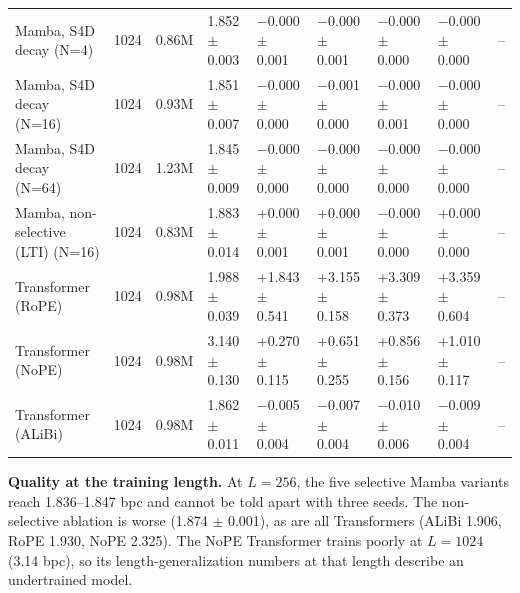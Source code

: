 \documentclass[11pt]{article}
\begin{document}
\begin{table}[t]
{\begin{tabular}{lllllllll}
Mamba, S4D decay (N=4) & 1024 & 0.86M & 1.852 $\pm$ 0.003 & $-$0.000 $\pm$ 0.001 & $-$0.000 $\pm$ 0.001 & $-$0.000 $\pm$ 0.000 & $-$0.000 $\pm$ 0.000 & -- \\
Mamba, S4D decay (N=16) & 1024 & 0.93M & 1.851 $\pm$ 0.007 & $-$0.000 $\pm$ 0.000 & $-$0.001 $\pm$ 0.000 & $-$0.000 $\pm$ 0.001 & $-$0.000 $\pm$ 0.000 & -- \\
Mamba, S4D decay (N=64) & 1024 & 1.23M & 1.845 $\pm$ 0.009 & $-$0.000 $\pm$ 0.000 & $-$0.000 $\pm$ 0.000 & $-$0.000 $\pm$ 0.000 & $-$0.000 $\pm$ 0.000 & -- \\
Mamba, non-selective (LTI) (N=16) & 1024 & 0.83M & 1.883 $\pm$ 0.014 & +0.000 $\pm$ 0.001 & +0.000 $\pm$ 0.001 & $-$0.000 $\pm$ 0.000 & +0.000 $\pm$ 0.000 & -- \\
Transformer (RoPE) & 1024 & 0.98M & 1.988 $\pm$ 0.039 & +1.843 $\pm$ 0.541 & +3.155 $\pm$ 0.158 & +3.309 $\pm$ 0.373 & +3.359 $\pm$ 0.604 & -- \\
Transformer (NoPE) & 1024 & 0.98M & 3.140 $\pm$ 0.130 & +0.270 $\pm$ 0.115 & +0.651 $\pm$ 0.255 & +0.856 $\pm$ 0.156 & +1.010 $\pm$ 0.117 & -- \\
Transformer (ALiBi) & 1024 & 0.98M & 1.862 $\pm$ 0.011 & $-$0.005 $\pm$ 0.004 & $-$0.007 $\pm$ 0.004 & $-$0.010 $\pm$ 0.006 & $-$0.009 $\pm$ 0.004 & -- \\
\bottomrule
\end{tabular}}
\end{table}

\textbf{Quality at the training length.} At $L = 256$, the five selective Mamba variants reach 1.836--1.847 bpc and cannot be told apart with three seeds. The non-selective ablation is worse (1.874 $\pm$ 0.001), as are all Transformers (ALiBi 1.906, RoPE 1.930, NoPE 2.325). The NoPE Transformer trains poorly at $L = 1024$ (3.14 bpc), so its length-generalization numbers at that length describe an undertrained model.
\end{document}
